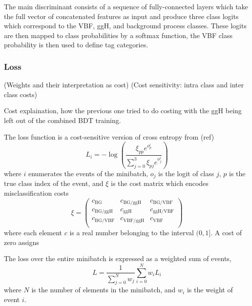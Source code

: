 The main discriminant consists of a sequence of fully-connected layers which take the full vector of concatenated features as input and produce three class logits which correspond to the VBF, ggH, and background process classes. 
These logits are then mapped to class probabilities by a softmax function, the VBF class probability is then used to define tag categories. 






\subsubsection{Loss}
(Weights and their interpretation as cost)
(Cost sensitivity: intra class and inter class costs)

Cost explaination, how the previous one tried to do costing with the ggH being left out of the combined BDT training. 

The loss function is a cost-sensitive version of cross entropy from (ref)
\begin{equation}
    L_i = -\log\left(\frac{\xi_{pp}e^{o^{i}_{p}}}{\sum_{j=0}^{3}\xi_{pj}e^{o^{i}_{j}}}\right)
\end{equation} 
where $i$ enumerates the events of the minibatch, $o_j$ is the logit of class $j$, $p$ is the true class index of the event, and $\xi$ is the cost matrix which encodes misclassification costs
\begin{equation}
    \xi = \begin{pmatrix}
        c_{\mathrm{BG}} & c_{\mathrm{BG}/\mathrm{ggH}} & c_{\mathrm{BG}/\mathrm{VBF}} \\
        c_{\mathrm{BG}/\mathrm{ggH}} & c_{\mathrm{ggH}} & c_{\mathrm{ggH}/\mathrm{VBF}} \\
        c_{\mathrm{BG}/\mathrm{VBF}} & c_{\mathrm{VBF}/\mathrm{ggH}} & c_{\mathrm{VBF}} \\
    \end{pmatrix}
\end{equation}
where each element $c$ is a real number belonging to the interval $(0,1]$. A cost of zero assigns

The loss over the entire minibatch is expressed as a weighted sum of events,
\begin{equation}
    L = \frac{1}{\sum_{j=0}^{N}w_{j}}\sum_{i=0}^{N}w_{i}L_{i}
\end{equation} 
where $N$ is the number of elements in the minibatch, and $w_i$ is the weight of event $i$.

